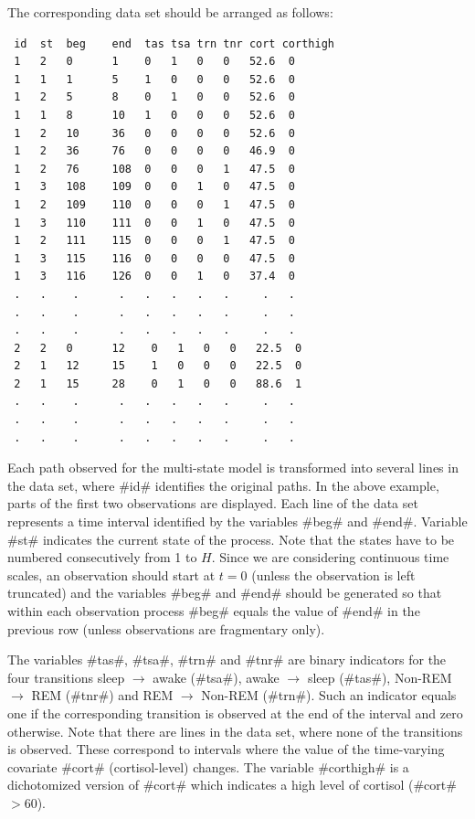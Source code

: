 The corresponding data set should be arranged as follows:

\begin{verbatim}
 id  st  beg    end  tas tsa trn tnr cort corthigh
 1   2   0      1    0   1   0   0   52.6  0
 1   1   1      5    1   0   0   0   52.6  0
 1   2   5      8    0   1   0   0   52.6  0
 1   1   8      10   1   0   0   0   52.6  0
 1   2   10     36   0   0   0   0   52.6  0
 1   2   36     76   0   0   0   0   46.9  0
 1   2   76     108  0   0   0   1   47.5  0
 1   3   108    109  0   0   1   0   47.5  0
 1   2   109    110  0   0   0   1   47.5  0
 1   3   110    111  0   0   1   0   47.5  0
 1   2   111    115  0   0   0   1   47.5  0
 1   3   115    116  0   0   0   0   47.5  0
 1   3   116    126  0   0   1   0   37.4  0
 .   .    .      .   .   .   .   .     .   .
 .   .    .      .   .   .   .   .     .   .
 .   .    .      .   .   .   .   .     .   .
 2   2   0      12    0   1   0   0   22.5  0
 2   1   12     15    1   0   0   0   22.5  0
 2   1   15     28    0   1   0   0   88.6  1
 .   .    .      .   .   .   .   .     .   .
 .   .    .      .   .   .   .   .     .   .
 .   .    .      .   .   .   .   .     .   .
\end{verbatim}

Each path observed for the multi-state model is transformed into
several lines in the data set, where #id# identifies the original
paths. In the above example, parts of the first two observations
are displayed. Each line of the data set represents a time
interval identified by the variables #beg# and #end#. Variable
#st# indicates the current state of the process. Note that the
states have to be numbered consecutively from 1 to $H$. Since we
are considering continuous time scales, an observation should
start at $t=0$ (unless the observation is left truncated) and the
variables #beg# and #end# should be generated so that within each
observation process #beg# equals the value of #end# in the
previous row (unless observations are fragmentary only).

The variables #tas#, #tsa#, #trn# and #tnr# are binary indicators
for the four transitions sleep $\rightarrow$ awake (#tsa#), awake
$\rightarrow$ sleep (#tas#), Non-REM $\rightarrow$ REM (#tnr#) and
REM $\rightarrow$ Non-REM (#trn#). Such an indicator equals one if
the corresponding transition is observed at the end of the
interval and zero otherwise. Note that there are lines in the data
set, where none of the transitions is observed. These correspond
to intervals where the value of the time-varying covariate #cort#
(cortisol-level) changes. The variable #corthigh# is a
dichotomized version of #cort# which indicates a high level of
cortisol (#cort#$>$60).

